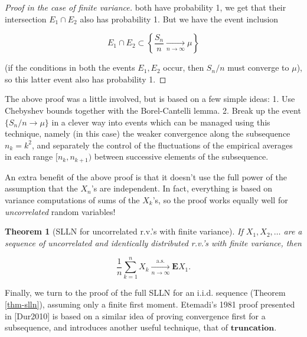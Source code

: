 \documentclass[11pt]{report}
\theoremstyle{plain}
\newtheorem{thm}{Theorem}[chapter]
\theoremstyle{definition}
\begin{document}
\begin{proof}[Proof in the case of finite variance]
both have probability 1, we get that their
intersection $E_1\cap E_2$ also has probability 1.
But we have the event inclusion

\[
E_1 \cap E_2 \subset \left\{ \frac{S_n}{n} \xrightarrow[n\to\infty]{} \mu \right\}
\]

(if the conditions in both the events $E_1, E_2$
occur, then $S_n/n$ must converge to $\mu$), so this
latter event also has probability 1.
\end{proof}

The above proof was a little involved, but is based
on a few simple ideas: 1. Use Chebyshev bounds
together with the Borel-Cantelli lemma. 2. Break up
the event $\{S_n/n\to \mu\}$ in a clever way into
events which can be managed using this technique,
namely (in this case) the weaker convergence along the
subsequence $n_k = k^2$, and separately the control
of the fluctuations of the empirical averages in each
range $[n_k,n_{k+1})$ between successive elements of
the subsequence.

An extra benefit of the above proof is that it
doesn't use the full power of the assumption that the
$X_n$'s are independent. In fact, everything is based
on variance computations of sums of the $X_k$'s, so
the proof works equally well for \emph{uncorrelated} random
variables!

\begin{thm}[SLLN for uncorrelated r.v.'s with finite variance]
If $X_1,X_2,\ldots$ are a sequence of uncorrelated
and identically distributed r.v.'s with finite
variance, then

\[
\frac{1}{n}\sum_{k=1}^n X_k \xrightarrow[n\to\infty]{\textrm{a.s.}} \mathbf{E} X_1.
\]

\end{thm}

Finally, we turn to the proof of the full SLLN for an
i.i.d. sequence (Theorem \ref{thm-slln}), assuming only a
finite first moment. Etemadi's 1981 proof presented in
[Dur2010] is based on a similar idea of proving
convergence first for a subsequence, and introduces
another useful technique, that of
$\textbf{truncation}$.
\end{document}
